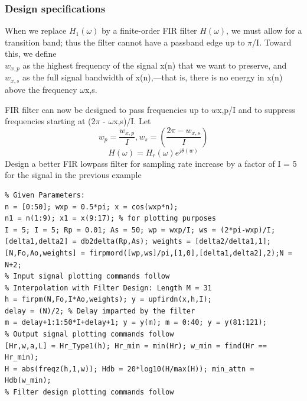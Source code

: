 \documentclass{article}
\begin{document}
\subsubsection{Design specifications}
When we replace $H_1(\omega)$ by a finite-order FIR filter $H(\omega)$, we must allow
for a transition band; thus the filter cannot have a passband edge up to
$\pi$/I. Toward this, we define \\
 $w_{x,p}$ as the highest frequency of the signal x(n) that we want to preserve, and \\
$w_{x,s}$  as the full signal bandwidth of x(n),—that is, there is no energy
in x(n) above the frequency $\omega$x,s.
\begin{figure}[H]
    \centering
    \label{fig:enter-label}
\end{figure}
FIR filter can now be designed to pass frequencies up to $w$x,p/I and to
suppress frequencies starting at (2$\pi$ - $\omega$x,s)/I. Let
\begin{equation}
w_p=\frac{w_{x,p}}{I}, w_s=(\frac{2\pi-w_{x,s}}{I})
\end{equation}
\begin{equation}
H(\omega) = H_r(\omega)e^{j\theta(w)}
\end{equation}
Design a better FIR lowpass filter for sampling rate increase by a factor of I = 5
for the signal in the previous example
\begin{lstlisting}
% Given Parameters:
n = [0:50]; wxp = 0.5*pi; x = cos(wxp*n);
n1 = n(1:9); x1 = x(9:17); % for plotting purposes
I = 5; I = 5; Rp = 0.01; As = 50; wp = wxp/I; ws = (2*pi-wxp)/I;
[delta1,delta2] = db2delta(Rp,As); weights = [delta2/delta1,1];
[N,Fo,Ao,weights] = firpmord([wp,ws]/pi,[1,0],[delta1,delta2],2);N = N+2;
% Input signal plotting commands follow
% Interpolation with Filter Design: Length M = 31
h = firpm(N,Fo,I*Ao,weights); y = upfirdn(x,h,I);
delay = (N)/2; % Delay imparted by the filter
m = delay+1:1:50*I+delay+1; y = y(m); m = 0:40; y = y(81:121);
% Output signal plotting commands follow
[Hr,w,a,L] = Hr_Type1(h); Hr_min = min(Hr); w_min = find(Hr == Hr_min);
H = abs(freqz(h,1,w)); Hdb = 20*log10(H/max(H)); min_attn = Hdb(w_min);
% Filter design plotting commands follow
\end{lstlisting}
\end{document}
